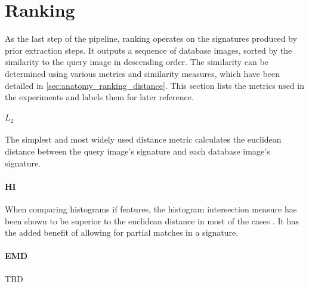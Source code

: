 \section{Ranking}

As the last step of the pipeline, ranking operates on the signatures produced
by prior extraction steps. It outputs a sequence of database images, sorted by
the similarity to the query image in descending order. The similarity can be
determined using various metrics and similarity measures, which have been
detailed in \ref{sec:anatomy_ranking_distance}. This section lists the metrics
used in the experiments and labels them for later reference.

\paragraph{$L_2$}

The simplest and most widely used distance metric calculates the euclidean
distance between the query image's signature and each database image's
signature.

\paragraph{HI}

When comparing histograms if features, the histogram intersection measure has
been shown to be superior to the euclidean distance in most of the cases
\autocite{wu_beyond_2009}. It has the added benefit of allowing for partial
matches in a signature.

\paragraph{EMD}

TBD
